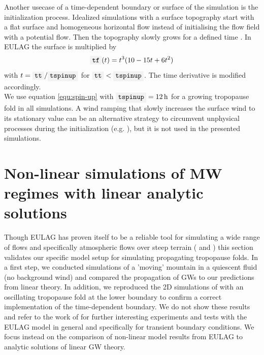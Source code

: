 Another usecase of a time-dependent boundary or surface of the simulation is the initialization process. Idealized simulations with a surface topography start with a flat surface and homogeneous horizontal flow instead of initialising the flow field with a potential flow. Then the topography slowly grows for a defined time . In EULAG the surface  is multiplied by
\begin{equation}
    \code{tf}(t) = t^3 (10 - 15t + 6t^2)
    \label{equ:spin-up}
\end{equation}
with $t = \code{tt} / \code{tspinup}$ for $\code{tt} < \code{tspinup}$. The time derivative  is modified accordingly. \\
We use equation \ref{equ:spin-up} with $\code{tspinup}=\SI{12}{\hour}$ for a growing tropopause fold in all simulations. A wind ramping that slowly increases the surface wind to its stationary value can be an alternative strategy to circumvent unphysical processes during the initialization (e.g. \cite[]{mixa_nonlinear_2021}), but it is not used in the presented simulations.

\section{Non-linear simulations of MW regimes with linear analytic solutions}
\label{sec:linear-MWs}
Though EULAG has proven itself to be a reliable tool for simulating a wide range of flows and specifically atmospheric flows over steep terrain (\cite{prusa_eulag_2008} and \cite{doyle_intercomparison_2011}) this section validates our specific model setup for simulating propagating tropopause folds. In a first step, we conducted simulations of a 'moving' mountain in a quiescent fluid (no background wind) and compared the propagation of GWs to our predictions from linear theory. In addition, we reproduced the 2D simulations of \textcite[]{prusa_all-scale_2003} with an oscillating tropopause fold at the lower boundary to confirm a correct implementation of the time-dependent boundary. We do not show these results and refer to the work of \textcite{grogger_simulation_2022} for further interesting experiments and tests with the EULAG model in general and specifically for transient boundary conditions. We focus instead on the comparison of non-linear model results from EULAG to analytic solutions of linear GW theory. 

